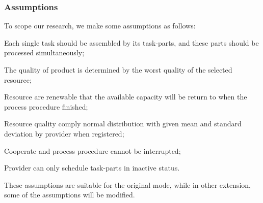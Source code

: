 \subsubsection{Assumptions} %
\label{ssub:assumptions_nomenclature}
To scope our research, we make some assumptions as follows:
\begin{compactitem}
\item Each single task should be assembled by its task-parts, and these parts should be processed simultaneously;
\item The quality of product is determined by the worst quality of the selected resource;
\item Resource are renewable that the available capacity will be return to when the process procedure finished;
\item Resource quality comply normal distribution with given mean and standard deviation by provider when registered;
\item Cooperate and process procedure cannot be interrupted;
\item Provider can only schedule task-parts in inactive status. 
\end{compactitem}
These assumptions are suitable for the original mode, while in other extension, some of the assumptions will be modified.

